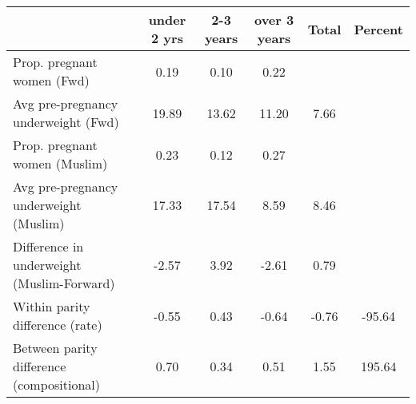 \begin{tabular}{l*{5}{c}}
\toprule
            &\multicolumn{1}{c}{under 2 yrs}&\multicolumn{1}{c}{2-3 years}&\multicolumn{1}{c}{over 3 years}&\multicolumn{1}{c}{Total}&\multicolumn{1}{c}{Percent}\\
\midrule
\midrule
Prop. pregnant women (Fwd)&        0.19&        0.10&        0.22&            &            \\
Avg pre-pregnancy underweight (Fwd)&       19.89&       13.62&       11.20&        7.66&            \\
Prop. pregnant women (Muslim)&        0.23&        0.12&        0.27&            &            \\
Avg pre-pregnancy underweight (Muslim)&       17.33&       17.54&        8.59&        8.46&            \\
Difference in underweight (Muslim-Forward)&       -2.57&        3.92&       -2.61&        0.79&            \\
Within parity difference (rate)&       -0.55&        0.43&       -0.64&       -0.76&      -95.64\\
Between parity difference (compositional)&        0.70&        0.34&        0.51&        1.55&      195.64\\
\bottomrule
\end{tabular}
